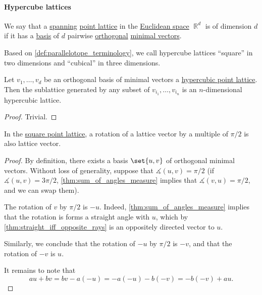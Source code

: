 \paragraph{Hypercube lattices}

\begin{definition}\label{def:hypercubic_point_lattice}
  We say that a \hyperref[thm:span_via_linear_combinations]{spanning} \hyperref[def:point_lattice]{point lattice} in the \hyperref[def:euclidean_plane]{Euclidean space} \( \BbbR^d \) is  of dimension \( d \) if it has a \hyperref[def:point_lattice_basis]{basis} of \( d \) pairwise \hyperref[def:orthogonality]{orthogonal} \hyperref[def:minimal_lattice_vector]{minimal vectors}.

  Based on \cref{def:parallelotope_terminology}, we call hypercube lattices \enquote{square} in two dimensions and \enquote{cubical} in three dimensions.
\end{definition}

\begin{proposition}\label{thm:hypercubic_point_sublattice}
  Let \( v_1, \ldots, v_d \) be an orthogonal basis of minimal vectors a \hyperref[def:hypercubic_point_lattice]{hypercubic point lattice}. Then the sublattice generated by any subset of \( v_{i_1}, \ldots, v_{i_n} \) is an \( n \)-dimensional hypercubic lattice.
\end{proposition}
\begin{proof}
  Trivial.
\end{proof}

\begin{proposition}\label{thm:hypercubic_point_lattice_vector_rotation}
  In the \hyperref[def:hypercubic_point_lattice]{square point lattice}, a rotation of a lattice vector by a multiple of \( \pi / 2 \) is also lattice vector.
\end{proposition}
\begin{proof}
  By definition, there exists a basis \( \set{ u, v } \) of orthogonal minimal vectors. Without loss of generality, suppose that \( \measuredangle(u, v) = \pi / 2 \) (if \( \measuredangle(u, v) = 3\pi / 2 \), \cref{thm:sum_of_angles_measure} implies that \( \measuredangle(v, u) = \pi / 2 \), and we can swap them).

  The rotation of \( v \) by \( \pi / 2 \) is \( -u \). Indeed, \cref{thm:sum_of_angles_measure} implies that the rotation is forms a straight angle with \( u \), which by \cref{thm:straight_iff_opposite_rays} is an oppositely directed vector to \( u \).

  Similarly, we conclude that the rotation of \( -u \) by \( \pi / 2 \) is \( -v \), and that the rotation of \( -v \) is \( u \).

  It remains to note that
  \begin{equation*}
    au + bv = bv - a(-u) = -a(-u) - b(-v) = -b(-v) + au.
  \end{equation*}
\end{proof}

